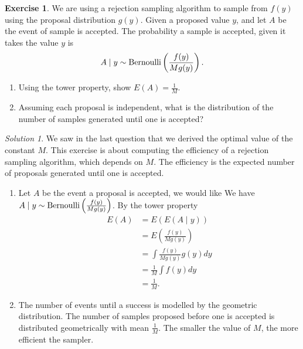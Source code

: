\documentclass[
]{book}
\providecommand{\tightlist}{%
  \setlength{\itemsep}{0pt}\setlength{\parskip}{0pt}}
\theoremstyle{definition}
\theoremstyle{definition}
\theoremstyle{definition}
\newtheorem{exercise}{Exercise}[chapter]
\theoremstyle{definition}
\theoremstyle{remark}
\newtheorem*{solution}{Solution}
\begin{document}
\begin{exercise}

We are using a rejection sampling algorithm to sample from \(f(y)\) using the proposal distribution \(g(y)\). Given a proposed value \(y\), and let \(A\) be the event of sample is accepted. The probability a sample is accepted, given it takes the value \(y\) is
\[
A \mid y \sim \hbox{Bernoulli}\left(\frac{f(y)}{Mg(y)}\right).
\]

\begin{enumerate}
\def\labelenumi{\arabic{enumi}.}
\tightlist
\item
  Using the tower property, show \(E(A) = \frac{1}{M}\).\\
\item
  Assuming each proposal is independent, what is the distribution of the number of samples generated until one is accepted?
\end{enumerate}

\end{exercise}

\begin{solution}

We saw in the last question that we derived the optimal value of the constant \(M\). This exercise is about computing the efficiency of a rejection sampling algorithm, which depends on \(M\). The efficiency is the expected number of proposals generated until one is accepted.

\begin{enumerate}
\def\labelenumi{\arabic{enumi}.}
\tightlist
\item
  Let \(A\) be the event a proposal is accepted, we would like We have \(A \mid y \sim \hbox{Bernoulli}\left(\frac{f(y)}{Mg(y)}\right)\). By the tower property
  \begin{align*}
  E(A) & = E(E(A\mid y)) \\
  & = E\left(\frac{f(y)}{Mg(y)}\right) \\
  & = \int \frac{f(y)}{Mg(y)} g(y) dy \\
  & = \frac{1}{M}\int f(y) dy \\
  & = \frac{1}{M}.
  \end{align*}
\item
  The number of events until a success is modelled by the geometric distribution. The number of samples proposed before one is accepted is distributed geometrically with mean \(\frac{1}{M}\). The smaller the value of \(M\), the more efficient the sampler.
\end{enumerate}

\end{solution}
\end{document}
